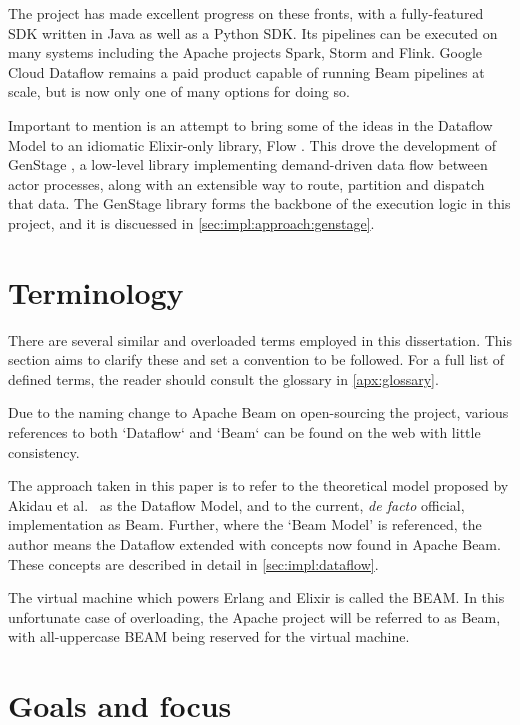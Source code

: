 The project has made excellent progress on these fronts, with a fully-featured SDK written in Java as well as a Python SDK.
Its pipelines can be executed on many systems including the Apache projects Spark, Storm and Flink.
Google Cloud Dataflow remains a paid product capable of running Beam pipelines at scale, but is now only one of many options for doing so.

Important to mention is an attempt to bring some of the ideas in the Dataflow Model to an idiomatic Elixir-only library, Flow \cite{ElixirFlow}.
This drove the development of GenStage \cite{ElixirGenStage}, a low-level library implementing demand-driven data flow between actor processes, along with an extensible way to route, partition and dispatch that data.
The GenStage library forms the backbone of the execution logic in this project, and it is discuessed in \cref{sec:impl:approach:genstage}.

\section{Terminology}\label{sec:intro:terminology}

There are several similar and overloaded terms employed in this dissertation.
This section aims to clarify these and set a convention to be followed.
For a full list of defined terms, the reader should consult the glossary in \cref{apx:glossary}.

Due to the naming change to Apache Beam on open-sourcing the project, various references to both `Dataflow` and `Beam` can be found on the web with little consistency.

The approach taken in this paper is to refer to the theoretical model proposed by Akidau et al.\ \cite{Akidau:2015} as the Dataflow Model, and to the current, \emph{de facto} official, implementation \cite{ApacheBeam} as Beam.
Further, where the `Beam Model' is referenced, the author means the Dataflow extended with concepts now found in Apache Beam.
These concepts are described in detail in \cref{sec:impl:dataflow}.

The virtual machine which powers Erlang and Elixir is called the BEAM.
In this unfortunate case of overloading, the Apache project will be referred to as Beam, with all-uppercase BEAM being reserved for the virtual machine.

\section{Goals and focus}\label{sec:intro:goals}

